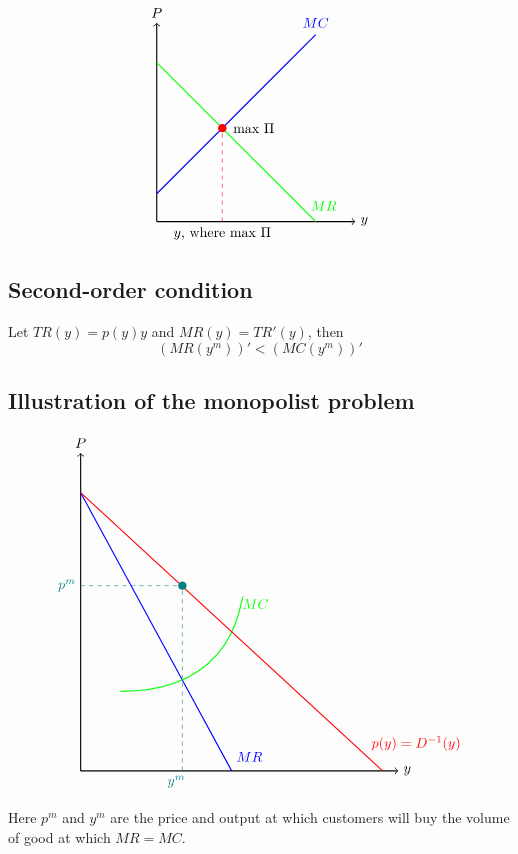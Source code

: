 \documentclass[a4paper, 10pt]{article}
\begin{document}
$$\begin{tikzpicture}[scale=2]

    \draw[thick,->] (0,0) -- (2.5,0) node[right] {$y$}; 
    \draw[thick,->] (0,0) -- (0,2.5) node[above] {$P$}; 

    \draw[thick, green] (0,2) -- (2,0);
    \draw[thick, blue] (0,0.35) -- (2,2.35);
    
    \fill[red] (0.825,1.175) circle (1.5pt);
    \node[anchor=west, black] at (0.9,1.175) {max $\Pi$};

    \draw[dashed, red] (0.825,0) -- (0.825,1.175);

    \node[black] at (0.825,-0.15) {$y$, where max $\Pi$};
    \node[blue] at (2,2.5) {$MC$};
    \node[green] at (2.1,0.2) {$MR$};

\end{tikzpicture}$$
\subsection{Second-order condition}
Let $TR(y)=p(y)y$ and $MR(y)=TR'(y)$, then
\begin{equation}
    \left(MR(y^m)\right)'<\left(MC(y^m)\right)'
\end{equation}
\subsection{Illustration of the monopolist problem}
$$
\begin{tikzpicture}[scale=2]

    \draw[thick,->] (0,0) -- (4,0) node[right] {$y$}; 
    \draw[thick,->] (0,0) -- (0,4) node[above] {$P$};

    \draw[thick, blue] (0,3.5) -- (1.9,0); %
    \draw[thick, green] (0.5,1) .. controls (2,1) and (2,2.2) .. (2.05,2.2); %
    \draw[thick, red] (0,3.5) -- (3.8,0);

    \fill[teal] (1.28,2.33) circle (1.5pt);


    \draw[dashed, teal] (1.28,0) -- (1.28,2.33);
    \draw[dashed, teal] (0,2.33) -- (1.28,2.33);
    \node[anchor=east, teal] at (0,2.33) {$p^m$};
    \node[anchor=north east, teal] at (1.38,0) {$y^m$};
    \node[anchor=north west, blue] at (1.9,0.3) {$MR$};
    \node[anchor=north west, red] at (3.6,0.5) {$p(y)=D^{-1}(y)$};
    \node[green] at (2.2,2.1) {$MC$};
    
\end{tikzpicture}
$$

Here $p^m$ and $y^m$ are the price and output at which customers will buy the volume of good at which $MR=MC$.
\end{document}
